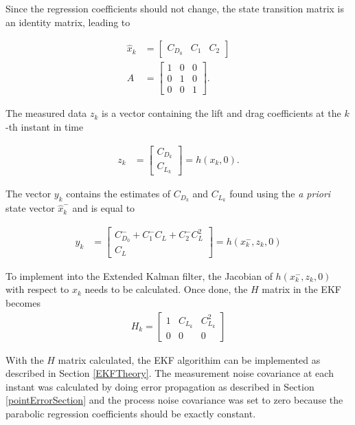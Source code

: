 Since the regression coefficients should not change, the state transition matrix is an identity matrix, leading to

\begin{align}
\hat{x}_k &= \begin{bmatrix}
C_{D_0} & C_1 & C_2
\end{bmatrix}\\
A &= \begin{bmatrix}
1&0&0\\0&1&0\\0&0&1
\end{bmatrix}.
\end{align}

The measured data $z_k$ is a vector containing the lift and drag coefficients at the $k$-th instant in time

\begin{align}
z_k &= \begin{bmatrix}
C_{D_k}\\C_{L_k}
\end{bmatrix} = h(x_{k},0).
\end{align}

The vector $y_k$ contains the estimates of $C_{D_k}$ and $C_{L_k}$ found using the \textit{a priori} state vector $\hat{x}^-_k$ and is equal to

\begin{align}
y_k &= \begin{bmatrix} C^-_{D_{0}}+C^-_{1}C_L+C^-_{2}C^2_L \\ C_L \end{bmatrix} =h(x^-_k,z_k,0)
\end{align}

To implement into the Extended Kalman filter, the Jacobian of $h(x^-_k,z_k,0)$ with respect to $x_k$ needs to be calculated. Once done, the $H$ matrix in the EKF becomes
\begin{align}
H_k = \begin{bmatrix}
1 & C_{L_k} & C^2_{L_k}\\0&0&0
\end{bmatrix}
\end{align}

With the $H$ matrix calculated, the EKF algorithim can be implemented as described in Section \ref{EKFTheory}. The measurement noise covariance at each instant was calculated by doing error propagation as described in Section \ref{pointErrorSection} and the process noise covariance was set to zero because the parabolic regression coefficients should be exactly constant.